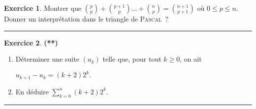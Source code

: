 \documentclass[a4paper,11pt]{article}
\theoremstyle{definition}
\newtheorem{exo}{Exercice} %
\begin{document}
\begin{minipage}[t]{1\linewidth}
\begin{minipage}[t]{0.48\linewidth}
\begin{exo}
			Montrer que $\binom{p}{p}+\binom{p+1}{p}... +\binom{n}{p}=\binom{n+1}{p+1}$ où $0\leq p\leq n$. Donner un interprétation dans le triangle de \textsc{Pascal}~?
			
			
			\centering
			\rule{1\linewidth}{0.6pt}
		\end{exo}
	
	\begin{exo}\textbf{(**)}\quad\\[0.2cm]
		
		\begin{enumerate}
			\item Déterminer une suite $(u_k)$ telle que, pour tout $k\geq 0$, on ait
			
			\centering$u_{k+1}-u_k=(k+2) 2^k.$
			
			\raggedright
			\item En déduire $\sum_{k=0}^{n}(k+2)2^k.$
		\end{enumerate}
		
		
		\centering
		\rule{1\linewidth}{0.6pt}
	\end{exo}
		
	
		
	\end{minipage}
\end{minipage}
\end{document}
